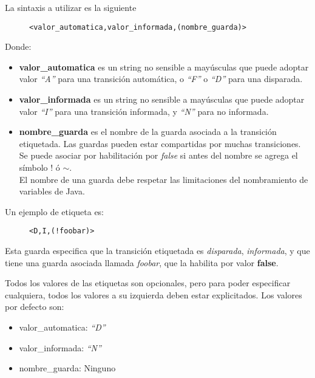 La sintaxis a utilizar es la siguiente

\begin{figure}[H]
\centering
\begin{verbatim}
<valor_automatica,valor_informada,(nombre_guarda)>
\end{verbatim}
\end{figure}

Donde:
\begin{itemize}
    \item \textbf{valor\_automatica} es un string no sensible a mayúsculas que
    puede adoptar valor \textit{``A''} para una transición automática, o
    \textit{``F''} o \textit{``D''} para una disparada.
    \item \textbf{valor\_informada} es un string no sensible a mayúsculas que
    puede adoptar valor \textit{``I''} para una transición informada, y
    \textit{``N''} para no informada.
    \item \textbf{nombre\_guarda} es el nombre de la guarda asociada a la
    transición etiquetada. Las guardas pueden estar compartidas por muchas
    transiciones. Se puede asociar por habilitación por \textit{false} si antes
    del nombre se agrega el símbolo $!$ ó $\mathtt{\sim}$.\\
    El nombre de una guarda debe respetar las limitaciones del nombramiento de
    variables de Java.
\end{itemize}

Un ejemplo de etiqueta es:

\begin{figure}[H]
\centering
\begin{verbatim}
<D,I,(!foobar)>
\end{verbatim}
\end{figure}

Esta guarda especifica que la transición etiquetada es \textit{disparada},
\textit{informada}, y que tiene una guarda asociada llamada \textit{foobar}, que
la habilita por valor \textbf{false}.

Todos los valores de las etiquetas son opcionales, pero para poder especificar
cualquiera, todos los valores a su izquierda deben estar explicitados. Los
valores por defecto son:
\begin{itemize}
    \item valor\_automatica: \textit{``D''}
    \item valor\_informada: \textit{``N''}
    \item nombre\_guarda: Ninguno
\end{itemize}

